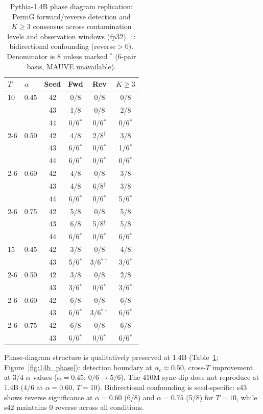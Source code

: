 \begin{table}[t]
\centering
\small
\caption{Pythia-1.4B phase diagram replication: PermG forward/reverse detection and $K{\geq}3$ consensus across contamination levels and observation windows (fp32). $\dagger$: bidirectional confounding (reverse${}>0$). Denominator is 8 unless marked $^{*}$ (6-pair basis, MAUVE unavailable).}
\label{tab:14b_phase}
\begin{tabular}{@{}llcccc@{}}
\toprule
$T$ & $\alpha$ & Seed & Fwd & Rev & $K{\geq}3$ \\
\midrule
10 & 0.45 & 42 & 0/8 & 0/8 & 0/8 \\
   &      & 43 & 1/8 & 0/8 & 2/8 \\
   &      & 44 & 0/6$^{*}$ & 0/6$^{*}$ & 0/6$^{*}$ \\
\cmidrule(l){2-6}
   & 0.50 & 42 & 4/8 & 2/8$^{\dagger}$ & 3/8 \\
   &      & 43 & 6/6$^{*}$ & 0/6$^{*}$ & 1/6$^{*}$ \\
   &      & 44 & 6/6$^{*}$ & 0/6$^{*}$ & 0/6$^{*}$ \\
\cmidrule(l){2-6}
   & 0.60 & 42 & 4/8 & 0/8 & 3/8 \\
   &      & 43 & 4/8 & 6/8$^{\dagger}$ & 3/8 \\
   &      & 44 & 6/6$^{*}$ & 0/6$^{*}$ & 5/6$^{*}$ \\
\cmidrule(l){2-6}
   & 0.75 & 42 & 5/8 & 0/8 & 5/8 \\
   &      & 43 & 6/8 & 5/8$^{\dagger}$ & 5/8 \\
   &      & 44 & 6/6$^{*}$ & 0/6$^{*}$ & 6/6$^{*}$ \\
\midrule
15 & 0.45 & 42 & 3/8 & 0/8 & 4/8 \\
   &      & 43 & 5/6$^{*}$ & 3/6$^{*\dagger}$ & 3/6$^{*}$ \\
\cmidrule(l){2-6}
   & 0.50 & 42 & 3/8 & 0/8 & 2/8 \\
   &      & 43 & 3/6$^{*}$ & 0/6$^{*}$ & 3/6$^{*}$ \\
\cmidrule(l){2-6}
   & 0.60 & 42 & 6/8 & 0/8 & 6/8 \\
   &      & 43 & 6/6$^{*}$ & 3/6$^{*\dagger}$ & 6/6$^{*}$ \\
\cmidrule(l){2-6}
   & 0.75 & 42 & 6/8 & 0/8 & 6/8 \\
   &      & 43 & 6/6$^{*}$ & 0/6$^{*}$ & 6/6$^{*}$ \\
\bottomrule
\end{tabular}
\end{table}

Phase-diagram structure is qualitatively preserved at 1.4B (Table~\ref{tab:14b_phase}; Figure~\ref{fig:14b_phase}): detection boundary at $\alpha_c{\approx}0.50$, cross-$T$ improvement at 3/4 $\alpha$ values ($\alpha{=}0.45$: $0/6{\to}5/6$).
The 410M sync-dip does not reproduce at 1.4B (4/6 at $\alpha{=}0.60$, $T{=}10$).
Bidirectional confounding is seed-specific: s43 shows reverse significance at $\alpha{=}0.60$ (6/8) and $\alpha{=}0.75$ (5/8) for $T{=}10$, while s42 maintains 0 reverse across all conditions.

